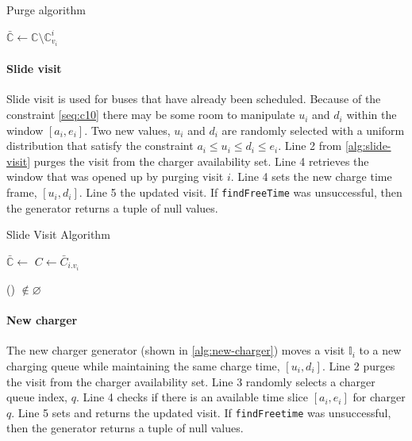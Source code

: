 \documentclass[11pt,a4paper,final]{article}
\newcommand{\I}{\mathbb{I}}                 %
\newcommand{\C}{\mathbb{C}}                 %
\newcommand{\Sol}{\mathbb{S}}               %
\begin{document}
\begin{algorithm}[H]
  \caption{Purge algorithm} \label{alg:purge}
    \LinesNumbered
    \KwIn{$\Sol$}
    \KwOut{$\bar{\Sol}$}

    \Begin
    {
        $\bar{\C} \leftarrow \C \setminus \C_{v_i}^i$
        \Return{$\bar{\C}$}
    }
  \end{algorithm}

\paragraph{Slide visit}
\label{slide-visit}
Slide visit is used for buses that have already been scheduled. Because of the constraint \ref{seq:c10} there may be
some room to manipulate \(u_i\) and \(d_i\) within the window \([a_i, e_i]\). Two new values, \(u_i\) and \(d_i\) are randomly
selected with a uniform distribution that satisfy the constraint \(a_i \leq u_i \leq d_i \leq e_i\). Line 2 from
\ref{alg:slide-visit} purges the visit from the charger availability set. Line 4 retrieves the window that was opened up
by purging visit \(i\). Line 4 sets the new charge time frame, \([u_i, d_i]\). Line 5 the updated visit. If \texttt{findFreeTime}
was unsuccessful, then the generator returns a tuple of null values.

\begin{algorithm}[H]
\caption{Slide Visit Algorithm} \label{alg:slide-visit}
    \LinesNumbered
    \KwIn{$\Sol$}
    \KwOut{$\bar{\Sol}$}


    \Begin
    {
      $\bar{\C} \leftarrow$\Purge{$\Sol$}
      $C \leftarrow \bar{C}_{i.v_i}$

        \If(){ $\not\in \varnothing$}
        {
          \Return{($\I_{i.q},u,d,\bar{C}$)}
        }
        \Return{($\varnothing$)}
    }
  \end{algorithm}

\paragraph{New charger}
\label{new-charger}
The new charger generator (shown in \ref{alg:new-charger}) moves a visit \(\I_i\) to a new charging queue while
maintaining the same charge time, \([u_i, d_i]\). Line 2 purges the visit from the charger availability set. Line 3
randomly selects a charger queue index, \(q\). Line 4 checks if there is an available time slice \([a_i, e_i]\) for charger
\(q\). Line 5 sets and returns the updated visit. If \texttt{findFreetime} was unsuccessful, then the generator returns a tuple
of null values.
\end{document}

